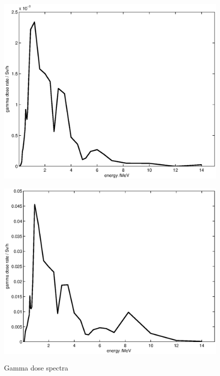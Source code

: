 \documentclass[11pt,a4paper]{IEEEtran}
\let\MYoriglatexcaption\caption
\renewcommand{\caption}[2][\relax]{\MYoriglatexcaption[#2]{#2}}
\begin{document}
\begin{figure}[t]
    \begin{minipage}{\columnwidth}
        \centering
        \includegraphics[width=0.9\columnwidth]{DoseVSenergySUP.eps}
        \label{fig:GammaDoseEnergySUP}
    \end{minipage}
    \begin{minipage}{\columnwidth}
        \centering
        \includegraphics[width=0.9\columnwidth]{DoseVSenergyCUP.eps}
        \label{fig:GammaDoseEnergyCUP}
    \end{minipage}
    \caption{Gamma dose spectra}
    \label{fig:GammaDoseEnergy}
\end{figure}
\end{document}
